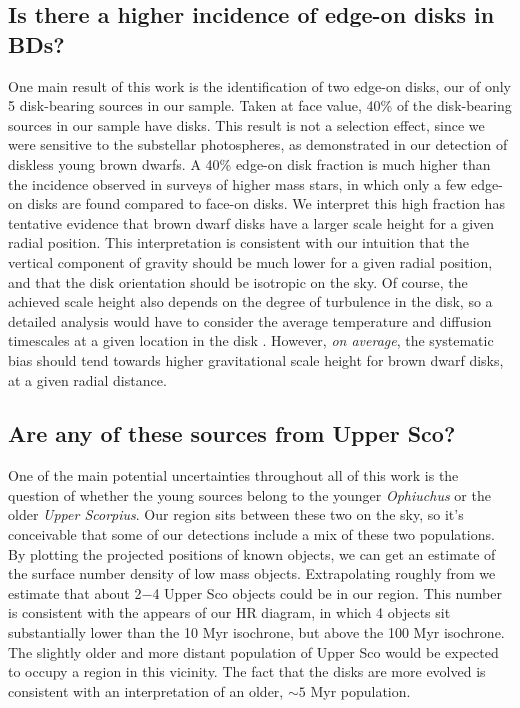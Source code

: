 \documentclass[12pt,preprint]{aastex}
\begin{document}
\subsection{Is there a higher incidence of edge-on disks in BDs?}
One main result of this work is the identification of two  edge-on disks, our of only 5 disk-bearing sources in our sample.  Taken at face value, 40\% of the disk-bearing sources in our sample have disks.  This result is not a selection effect, since we were sensitive to the substellar photospheres, as demonstrated in our detection of diskless young brown dwarfs.  A 40\% edge-on disk fraction is much higher than the incidence observed in surveys of higher mass stars, in which only a few edge-on disks are found compared to face-on disks.  We interpret this high fraction has tentative evidence that brown dwarf disks have a larger scale height for a given radial position.  This interpretation is consistent with our intuition that the vertical component of gravity should be much lower for a given radial position, and that the disk orientation should be isotropic on the sky.  Of course, the achieved scale height also depends on the degree of turbulence in the disk, so a detailed analysis would have to consider the average temperature and diffusion timescales at a given location in the disk \citep{2012A&A...539A...9M, 2009MNRAS.394L.141E}.  However, \emph{on average}, the systematic bias should tend towards higher gravitational scale height for brown dwarf disks, at a given radial distance.

\subsection{Are any of these sources from Upper Sco?}

One of the main potential uncertainties throughout all of this work is the question of whether the young sources belong to the younger \emph{Ophiuchus} or the older \emph{Upper Scorpius}.  Our region sits between these two on the sky, so it's conceivable that some of our detections include a mix of these two populations.  By plotting the projected positions of known objects, we can get an estimate of the surface number density of low mass objects.  Extrapolating roughly from \citet{2006AJ....131.3016S, 2012ApJ...758...31L} we estimate that about 2$-$4 Upper Sco objects could be in our region.  This number is consistent with the appears of our HR diagram, in which 4 objects sit substantially lower than the 10 Myr isochrone, but above the 100 Myr isochrone.  The slightly older and more distant population of Upper Sco would be expected to occupy a region in this vicinity.  The fact that the disks are more evolved is consistent with an interpretation of an older, $\sim5$ Myr population.
\end{document}
